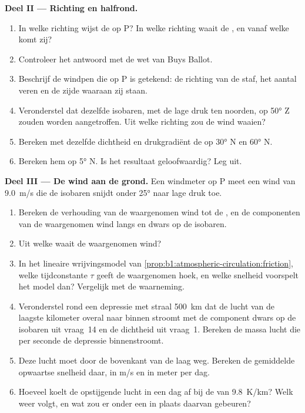 \begin{problem}
\medskip
\noindent\textbf{Deel II --- Richting en halfrond.}
\begin{enumerate}[resume]
  \item In welke richting wijst de  op P? In welke
        richting waait de , en vanaf welke  komt zij?
  \item Controleer het antwoord met de wet van Buys Ballot.
  \item Beschrijf de windpen die op P is getekend: de richting van de staf, het aantal veren en de zijde waaraan zij staan.
  \item Veronderstel dat dezelfde isobaren, met de lage druk ten noorden, op \ang{50} Z zouden worden aangetroffen. Uit welke richting zou de wind waaien?
  \item Bereken met dezelfde dichtheid en drukgradiënt de  op \ang{30} N en \ang{60} N.
  \item Bereken hem op \ang{5} N. Is het resultaat geloofwaardig? Leg uit.
\end{enumerate}

\medskip
\noindent\textbf{Deel III --- De wind aan de grond.} Een windmeter op P meet een
wind van \qty{9.0}{m/s} die de isobaren snijdt onder \ang{25} naar lage druk toe.
\begin{enumerate}[resume]
  \item Bereken de verhouding van de waargenomen wind tot de , en de
        componenten van de waargenomen wind langs en dwars op de isobaren.
  \item Uit welke  waait de waargenomen wind?
  \item In het lineaire wrijvingsmodel van \cref{prop:b1:atmospheric-circulation:friction},
        welke tijdconstante $\tau$ geeft de waargenomen hoek, en welke snelheid voorspelt het
        model dan? Vergelijk met de waarneming.
  \item Veronderstel rond een depressie met straal \qty{500}{km} dat de lucht van de
        laagste kilometer overal naar binnen stroomt met de component dwars op de isobaren uit
        vraag~14 en de dichtheid uit vraag~1. Bereken de massa lucht die per seconde
        de depressie binnenstroomt.
  \item Deze lucht moet door de bovenkant van de laag weg. Bereken de gemiddelde opwaartse
        snelheid daar, in \unit{m/s} en in meter per dag.
  \item Hoeveel koelt de opstijgende lucht in een dag af bij de  van \qty{9.8}{K/km}? Welk weer volgt, en wat zou er
        onder een  in plaats daarvan gebeuren?
\end{enumerate}


\end{problem}
